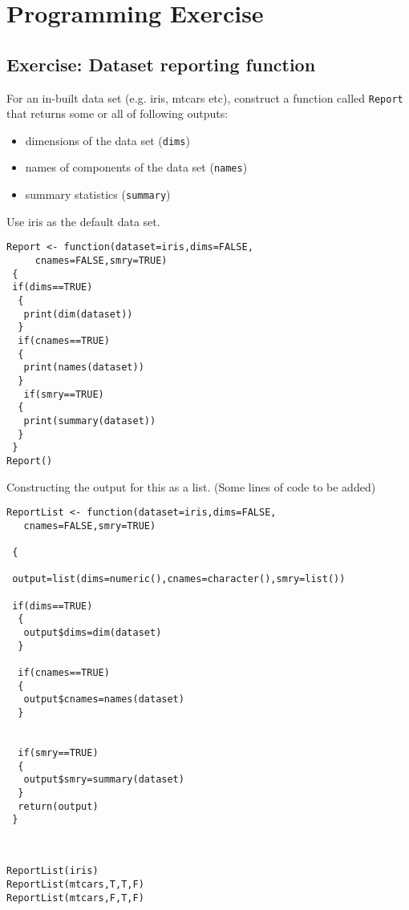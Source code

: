 \documentclass[]{article}
\begin{document}
\tableofcontents
\newpage

\section{Programming Exercise}

\subsection{Exercise: Dataset reporting function}
For an in-built data set (e.g. iris, mtcars etc), construct a function called \texttt{Report} that returns some or all of following outputs:

\begin{itemize}
\item dimensions of the data set (\texttt{dims})
\item names of components of the data set (\texttt{names})
\item summary statistics (\texttt{summary})
\end{itemize}
\noindent Use iris as the default data set.
\begin{framed}
\begin{verbatim}
Report <- function(dataset=iris,dims=FALSE,
     cnames=FALSE,smry=TRUE)
 {
 if(dims==TRUE)
  {
   print(dim(dataset))
  }
  if(cnames==TRUE)
  {
   print(names(dataset))
  }
   if(smry==TRUE)
  {
   print(summary(dataset))
  }
 }
Report()
\end{verbatim}
\end{framed}
\newpage
\noindent Constructing the output for this as a list. (Some lines of code to be added)

\begin{framed}
\begin{verbatim}
ReportList <- function(dataset=iris,dims=FALSE,
   cnames=FALSE,smry=TRUE)

 {

 output=list(dims=numeric(),cnames=character(),smry=list())

 if(dims==TRUE)
  {
   output$dims=dim(dataset)
  }

  if(cnames==TRUE)
  {
   output$cnames=names(dataset)
  }


  if(smry==TRUE)
  {
   output$smry=summary(dataset)
  }
  return(output)
 }



\end{verbatim}
\end{framed}

\begin{verbatim}
ReportList(iris)
ReportList(mtcars,T,T,F)
ReportList(mtcars,F,T,F)
\end{verbatim}
\newpage
\end{document}
